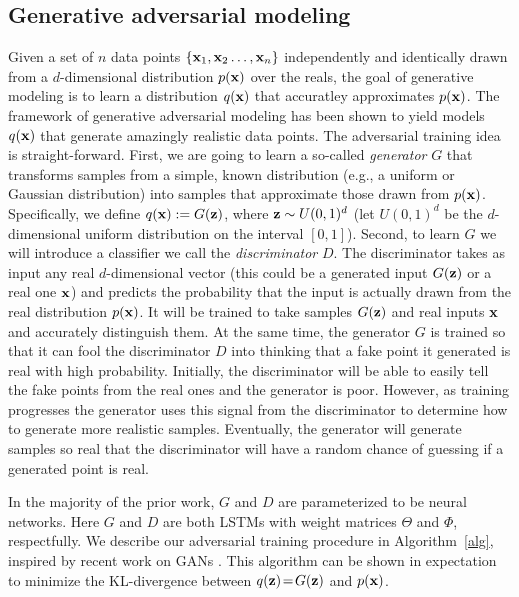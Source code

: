 \subsection*{Generative adversarial modeling}

Given a set of $n$ data points $\{ \mathbf{x}_1, \mathbf{x}_2 \ldots, \mathbf{x}_n\}$ independently and identically drawn from a $d$-dimensional distribution $p(\mathbf{x})$ over the reals, the goal of generative modeling is to learn a distribution $q(\mathbf{x})$ that accuratley approximates $p(\mathbf{x})$. The framework of generative adversarial modeling has been shown to yield models $q(\mathbf{x})$ that generate amazingly realistic data points. The adversarial training idea is straight-forward. First, we are going to learn a so-called \emph{generator} $G$ that transforms samples from a simple, known distribution (e.g., a uniform or Gaussian distribution) into samples that approximate those drawn from $p(\mathbf{x})$. Specifically, we define $q(\mathbf{x}) := G(\mathbf{z})$, where $\mathbf{z} \sim U(0,1)^d$ (let $U(0,1)^d$ be the $d$-dimensional uniform distribution on the interval $[0,1]$). Second, to learn $G$ we will introduce a classifier we call the \emph{discriminator} $D$. The discriminator takes as input any real $d$-dimensional vector (this could be a generated input $G(\mathbf{z})$ or a real one $\mathbf{x}$) and predicts the probability that the input is actually drawn from the real distribution $p(\mathbf{x})$. It will be trained to take samples $G(\mathbf{z})$ and real inputs $\mathbf{x}$ and accurately distinguish them. At the same time, the generator $G$ is trained so that it can fool the discriminator $D$ into thinking that a fake point it generated is real with high probability. Initially, the discriminator will be able to easily tell the fake points from the real ones and the generator is poor. However, as training progresses the generator uses this signal from the discriminator to determine how to generate more realistic samples. Eventually, the generator will generate samples so real that the discriminator will have a random chance of guessing if a generated point is real.

In the majority of the prior work, $G$ and $D$ are parameterized to be neural networks. Here $G$ and $D$ are both LSTMs with weight matrices $\Theta$ and $\Phi$, respectfully. We describe our adversarial training procedure in Algorithm~\ref{alg}, inspired by recent work on GANs \cite{sonderby2016amortised}. This algorithm can be shown in expectation to minimize the KL-divergence between $q(\mathbf{z}) \!=\! G(\mathbf{z})$ and $p(\mathbf{x})$.


